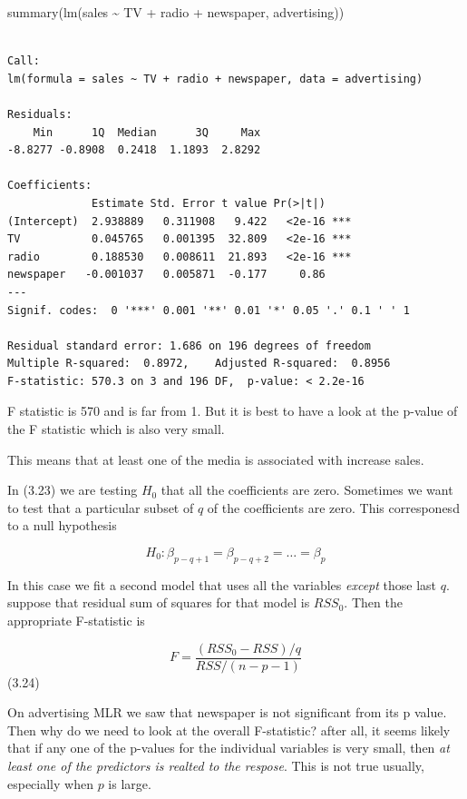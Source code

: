 \documentclass[
  letterpaper,
  DIV=11,
  numbers=noendperiod]{scrreprt}
\newenvironment{Shaded}{\begin{snugshade}}{\end{snugshade}}
\newcommand{\FunctionTok}[1]{\textcolor[rgb]{0.02,0.16,0.49}{#1}}
\newcommand{\NormalTok}[1]{\textcolor[rgb]{0.33,0.33,0.33}{#1}}
\newcommand{\SpecialCharTok}[1]{\textcolor[rgb]{0.00,0.46,0.62}{#1}}
\begin{document}
\begin{Shaded}
\begin{Highlighting}[]
\FunctionTok{summary}\NormalTok{(}\FunctionTok{lm}\NormalTok{(sales }\SpecialCharTok{\textasciitilde{}}\NormalTok{ TV }\SpecialCharTok{+}\NormalTok{ radio }\SpecialCharTok{+}\NormalTok{ newspaper, advertising))}
\end{Highlighting}
\end{Shaded}

\begin{verbatim}

Call:
lm(formula = sales ~ TV + radio + newspaper, data = advertising)

Residuals:
    Min      1Q  Median      3Q     Max 
-8.8277 -0.8908  0.2418  1.1893  2.8292 

Coefficients:
             Estimate Std. Error t value Pr(>|t|)    
(Intercept)  2.938889   0.311908   9.422   <2e-16 ***
TV           0.045765   0.001395  32.809   <2e-16 ***
radio        0.188530   0.008611  21.893   <2e-16 ***
newspaper   -0.001037   0.005871  -0.177     0.86    
---
Signif. codes:  0 '***' 0.001 '**' 0.01 '*' 0.05 '.' 0.1 ' ' 1

Residual standard error: 1.686 on 196 degrees of freedom
Multiple R-squared:  0.8972,    Adjusted R-squared:  0.8956 
F-statistic: 570.3 on 3 and 196 DF,  p-value: < 2.2e-16
\end{verbatim}

F statistic is 570 and is far from 1. But it is best to have a look at
the p-value of the F statistic which is also very small.

This means that at least one of the media is associated with increase
sales.

In (3.23) we are testing \(H_0\) that all the coefficients are zero.
Sometimes we want to test that a particular subset of \(q\) of the
coefficients are zero. This corresponesd to a null hypothesis

\[
  H_0 : \beta_{p-q+1} = \beta_{p-q+2} = \dots = \beta_p
  \]

In this case we fit a second model that uses all the variables
\emph{except} those last \(q\). suppose that residual sum of squares for
that model is \(RSS_0\). Then the appropriate F-statistic is

\[
  F = \frac{(RSS_0 - RSS)/q}{RSS/(n-p-1)}
  \] (3.24)

On advertising MLR we saw that newspaper is not significant from its p
value. Then why do we need to look at the overall F-statistic? after
all, it seems likely that if any one of the p-values for the individual
variables is very small, then \emph{at least one of the predictors is
realted to the respose}. This is not true usually, especially when \(p\)
is large.
\end{document}
